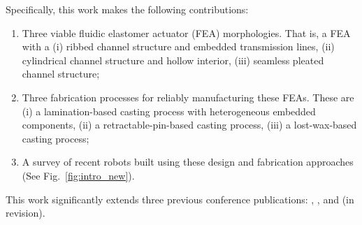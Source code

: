 Specifically, this work makes the following contributions:
\begin{enumerate}
  \item Three viable fluidic elastomer actuator (FEA) morphologies. That is, a FEA with a (i) ribbed channel structure and embedded transmission lines, (ii) cylindrical channel structure and hollow interior, (iii) seamless pleated channel structure;
  \item Three fabrication processes for reliably manufacturing these FEAs. These are (i) a lamination-based casting process with heterogeneous embedded components, (ii) a retractable-pin-based casting process, (iii) a lost-wax-based casting process;
  \item A survey of recent robots built using these design and fabrication approaches (See Fig.~\ref{fig:intro_new}).
\end{enumerate}
This work significantly extends three previous conference publications: \citep{marchese2014design}, \citep{marchese2014whole}, and \citep{katzschmann2015autonomous} (in revision). %